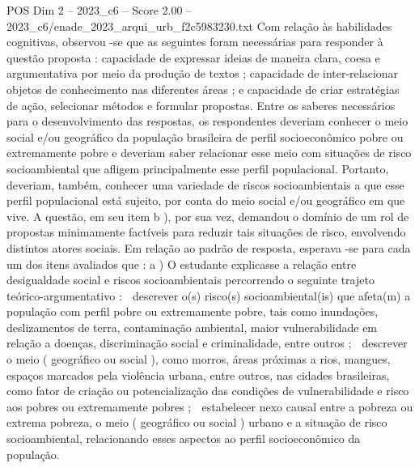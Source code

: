 \begin{textsample}{POS Dim 2 – 2023\_c6 – Score 2.00 – 2023\_c6/enade\_2023\_arqui\_urb\_f2c5983230.txt}
Com relação às habilidades cognitivas, observou -se que as seguintes foram necessárias para responder à questão proposta : capacidade de expressar ideias de maneira clara, coesa e argumentativa por meio da produção de textos ; capacidade de inter-relacionar objetos de conhecimento nas diferentes áreas ; e capacidade de criar estratégias de ação, selecionar métodos e formular propostas.
Entre os saberes necessários para o desenvolvimento das respostas, os respondentes deveriam conhecer o meio social e/ou geográfico da população brasileira de perfil socioeconômico pobre ou extremamente pobre e deveriam saber relacionar esse meio com situações de risco socioambiental que afligem principalmente esse perfil populacional.
Portanto, deveriam, também, conhecer uma variedade de riscos socioambientais a que esse perfil populacional está sujeito, por conta do meio social e/ou geográfico em que vive.
A questão, em seu item b ), por sua vez, demandou o domínio de um rol de propostas minimamente factíveis para reduzir tais situações de risco, envolvendo distintos atores sociais.
Em relação ao padrão de resposta, esperava -se para cada um dos itens avaliados que : a ) O estudante explicasse a relação entre desigualdade social e riscos socioambientais percorrendo o seguinte trajeto teórico-argumentativo :  descrever o(s) risco(s) socioambiental(is) que afeta(m) a população com perfil pobre ou extremamente pobre, tais como inundações, deslizamentos de terra, contaminação ambiental, maior vulnerabilidade em relação a doenças, discriminação social e criminalidade, entre outros ;  descrever o meio ( geográfico ou social ), como morros, áreas próximas a rios, mangues, espaços marcados pela violência urbana, entre outros, nas cidades brasileiras, como fator de criação ou potencialização das condições de vulnerabilidade e risco aos pobres ou extremamente pobres ;  estabelecer nexo causal entre a pobreza ou extrema pobreza, o meio ( geográfico ou social ) urbano e a situação de risco socioambiental, relacionando esses aspectos ao perfil socioeconômico da população.

\end{textsample}
